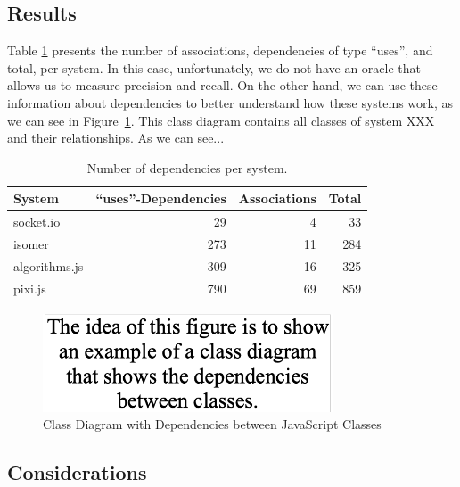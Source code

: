 \documentclass[review]{elsarticle}
\newcommand{\aspas}[1]{{``#1''}}
\begin{document}
\subsection{Results}
\label{sec:results-vanilla}

Table \ref{tab:results-vanilla} presents the number of associations, dependencies of type \aspas{uses}, and total, per system. In this case, unfortunately, we do not have an oracle that allows us to measure precision and recall. On the other hand, we can use these information about dependencies to better understand how these systems work, as we can see in Figure~\ref{fig:class-diagram}. This class diagram contains all classes of system XXX and their relationships. As we can see... 
 
\begin{table}[hbp]
	\footnotesize
	\centering
	\caption{Number of dependencies per system.}
	\begin{tabular}{lrrr}
		\toprule
		System                & \aspas{uses}-Dependencies & Associations & Total    \\
		\midrule
		{\sc socket.io}     &                         29 &            4 &    33    \\  
		{\sc isomer}         &                       273 &           11 &   284    \\  
		{\sc algorithms.js} &                     309 &           16 &   325  \\  
		{\sc pixi.js}            &                     790 &           69 &   859     \\ 
		\bottomrule
	\end{tabular}
	\label{tab:results-vanilla}
\end{table}


\begin{figure}[h]
	\centering
	\captionsetup{justification=centering}
	\includegraphics[width=3.4in]{fig/class-diagram-XXX.png}
	\caption{Class Diagram with Dependencies between JavaScript Classes}
	\label{fig:class-diagram}
\end{figure}



\subsection{Considerations}
\label{sec:considerations-vanilla}
\end{document}

